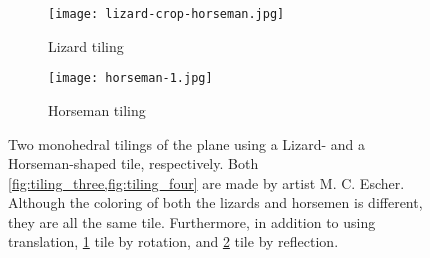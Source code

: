 
\begin{figure}
    \centering
    \begin{subfigure}{.47\textwidth}
        \centering
        \texttt{[image: lizard-crop-horseman.jpg]}
        \caption{Lizard tiling \cite{m.c.escherLizard1942}}
        \label{fig:tiling_three}
    \end{subfigure}\quad
    \begin{subfigure}{.47\textwidth}
        \centering
        \texttt{[image: horseman-1.jpg]}
        \caption{Horseman tiling \cite{m.c.escherHorseman1946}}
        \label{fig:tiling_four}
    \end{subfigure}
    \caption{Two monohedral tilings of the plane using a Lizard- and a Horseman-shaped tile, respectively. Both \cref{fig:tiling_three,fig:tiling_four} are made by artist M. C. Escher. Although the coloring of both the lizards and horsemen is different, they are all the same tile. Furthermore, in addition to using translation, \cref{fig:tiling_three} tile by rotation, and \cref{fig:tiling_four} tile by reflection.}
    \label{fig:tilings_three_four}
\end{figure}





